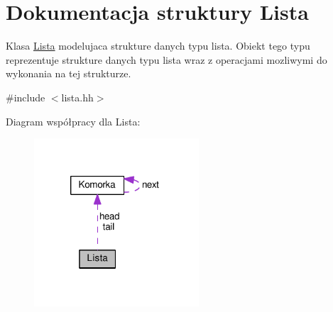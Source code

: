 \hypertarget{struct_lista}{\section{Dokumentacja struktury Lista}
\label{struct_lista}
}


Klasa \hyperlink{struct_lista}{Lista} modelujaca strukture danych typu lista. Obiekt tego typu reprezentuje strukture danych typu lista wraz z operacjami mozliwymi do wykonania na tej strukturze.  




{\ttfamily \#include $<$lista.\-hh$>$}



Diagram współpracy dla Lista\-:
\nopagebreak
\begin{figure}[H]
\begin{center}
\leavevmode
\includegraphics[width=174pt]{struct_lista__coll__graph}
\end{center}
\end{figure}
